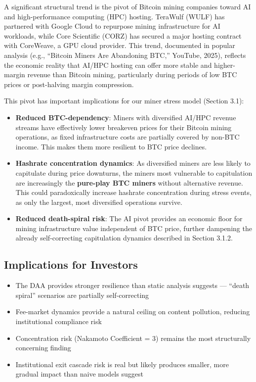 \documentclass[
  11pt,
]{article}
\providecommand{\tightlist}{%
  \setlength{\itemsep}{0pt}\setlength{\parskip}{0pt}}\usepackage{longtable,booktabs,array}
\let\oldsubsection\subsection
\renewcommand{\subsection}[1]{\FloatBarrier\oldsubsection{#1}}
\begin{document}
A significant structural trend is the pivot of Bitcoin mining companies
toward AI and high-performance computing (HPC) hosting. TeraWulf (WULF)
has partnered with Google Cloud to repurpose mining infrastructure for
AI workloads, while Core Scientific (CORZ) has secured a major hosting
contract with CoreWeave, a GPU cloud provider. This trend, documented in
popular analysis (e.g., ``Bitcoin Miners Are Abandoning BTC,'' YouTube,
2025), reflects the economic reality that AI/HPC hosting can offer more
stable and higher-margin revenue than Bitcoin mining, particularly
during periods of low BTC prices or post-halving margin compression.

This pivot has important implications for our miner stress model
(Section 3.1):

\begin{itemize}
\tightlist
\item
  \textbf{Reduced BTC-dependency}: Miners with diversified AI/HPC
  revenue streams have effectively lower breakeven prices for their
  Bitcoin mining operations, as fixed infrastructure costs are partially
  covered by non-BTC income. This makes them more resilient to BTC price
  declines.
\item
  \textbf{Hashrate concentration dynamics}: As diversified miners are
  less likely to capitulate during price downturns, the miners most
  vulnerable to capitulation are increasingly the \textbf{pure-play BTC
  miners} without alternative revenue. This could paradoxically increase
  hashrate concentration during stress events, as only the largest, most
  diversified operations survive.
\item
  \textbf{Reduced death-spiral risk}: The AI pivot provides an economic
  floor for mining infrastructure value independent of BTC price,
  further dampening the already self-correcting capitulation dynamics
  described in Section 3.1.2.
\end{itemize}

\hypertarget{implications-for-investors}{%
\subsection{Implications for
Investors}\label{implications-for-investors}}

\begin{itemize}
\tightlist
\item
  The DAA provides stronger resilience than static analysis suggests ---
  ``death spiral'' scenarios are partially self-correcting
\item
  Fee-market dynamics provide a natural ceiling on content pollution,
  reducing institutional compliance risk
\item
  Concentration risk (Nakamoto Coefficient = 3) remains the most
  structurally concerning finding
\item
  Institutional exit cascade risk is real but likely produces smaller,
  more gradual impact than naive models suggest
\end{itemize}
\end{document}
